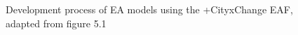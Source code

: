 \begin{figure}
    \centering
    
    \caption{Development process of EA models using the +CityxChange EAF, adapted from \cite{cityxchange-d1.2} figure 5.1}
    \label{fig:4-architecture-development}
\end{figure}
